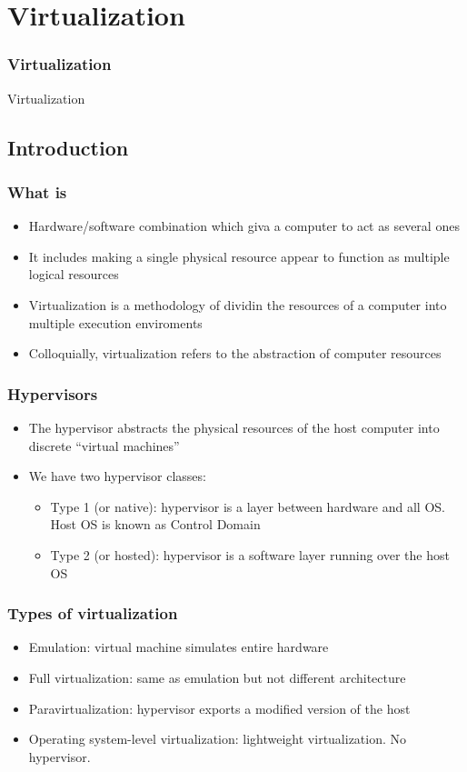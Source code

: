 \documentclass{beamer}
\begin{document}
\section{Virtualization}

\begin{frame}
  \frametitle{Virtualization}
  \begin{center}
    \Huge Virtualization
  \end{center}
\end{frame}

  \subsection{Introduction}
  \begin{frame}
    \frametitle{What is}
    \begin{itemize}
      \item Hardware/software combination which giva a computer to act as several ones
      \item It includes making a single physical resource appear to function as multiple logical resources
      \item Virtualization is a methodology of dividin the resources of a computer into multiple execution enviroments
      \item Colloquially, virtualization refers to the abstraction of computer resources
    \end{itemize}
  \end{frame}
  
  \begin{frame}
    \frametitle{Hypervisors}
    \begin{itemize}
      \item The hypervisor abstracts the physical resources of the host computer into discrete ``virtual machines''
      \item We have two hypervisor classes:
        \begin{itemize}
          \item Type 1 (or native): hypervisor is a layer between hardware and all OS. Host OS is known as Control Domain
          \item Type 2 (or hosted): hypervisor is a software layer running over the host OS
        \end{itemize}
    \end{itemize}
  \end{frame}
  
  \begin{frame}
    \frametitle{Types of virtualization}
    \begin{itemize}
      \item Emulation: virtual machine simulates entire hardware
      \item Full virtualization: same as emulation but not different architecture
      \item Paravirtualization: hypervisor exports a modified version of the host
      \item Operating system-level virtualization: lightweight virtualization. No hypervisor.
    \end{itemize}
  \end{frame}
  
\end{document}
